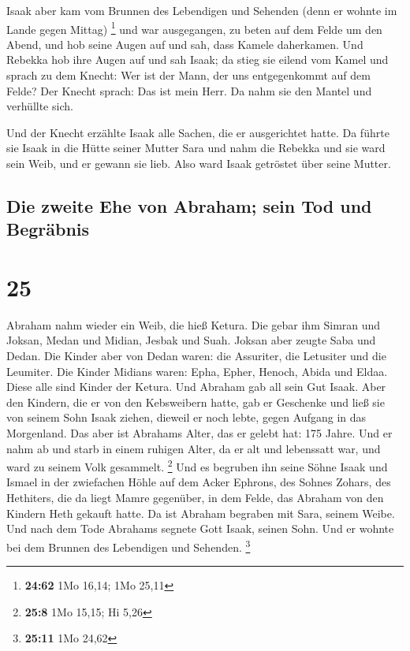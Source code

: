  Isaak aber kam vom Brunnen des Lebendigen und Sehenden
(denn er wohnte im Lande gegen Mittag) \footnote{\textbf{24:62} 1Mo
  16,14; 1Mo 25,11}  und war ausgegangen, zu beten auf
dem Felde um den Abend, und hob seine Augen auf und sah, dass Kamele
daherkamen.  Und Rebekka hob ihre Augen auf und sah
Isaak; da stieg sie eilend vom Kamel  und sprach zu dem
Knecht: Wer ist der Mann, der uns entgegenkommt auf dem Felde? Der
Knecht sprach: Das ist mein Herr. Da nahm sie den Mantel und verhüllte
sich.

 Und der Knecht erzählte Isaak alle Sachen, die er
ausgerichtet hatte.  Da führte sie Isaak in die Hütte
seiner Mutter Sara und nahm die Rebekka und sie ward sein Weib, und er
gewann sie lieb. Also ward Isaak getröstet über seine Mutter.

\hypertarget{die-zweite-ehe-von-abraham-sein-tod-und-begruxe4bnis}{%
\subsection{Die zweite Ehe von Abraham; sein Tod und
Begräbnis}\label{die-zweite-ehe-von-abraham-sein-tod-und-begruxe4bnis}}

\hypertarget{section-24}{%
\section{25}\label{section-24}}

 Abraham nahm wieder ein Weib, die hieß Ketura.
 Die gebar ihm Simran und Joksan, Medan und Midian, Jesbak
und Suah.  Joksan aber zeugte Saba und Dedan. Die Kinder
aber von Dedan waren: die Assuriter, die Letusiter und die Leumiter.
 Die Kinder Midians waren: Epha, Epher, Henoch, Abida und
Eldaa. Diese alle sind Kinder der Ketura.  Und Abraham gab
all sein Gut Isaak.  Aber den Kindern, die er von den
Kebsweibern hatte, gab er Geschenke und ließ sie von seinem Sohn Isaak
ziehen, dieweil er noch lebte, gegen Aufgang in das Morgenland.
 Das aber ist Abrahams Alter, das er gelebt hat: 175
Jahre.  Und er nahm ab und starb in einem ruhigen Alter,
da er alt und lebenssatt war, und ward zu seinem Volk gesammelt.
\footnote{\textbf{25:8} 1Mo 15,15; Hi 5,26}  Und es
begruben ihn seine Söhne Isaak und Ismael in der zwiefachen Höhle auf
dem Acker Ephrons, des Sohnes Zohars, des Hethiters, die da liegt Mamre
gegenüber,  in dem Felde, das Abraham von den Kindern
Heth gekauft hatte. Da ist Abraham begraben mit Sara, seinem Weibe.
 Und nach dem Tode Abrahams segnete Gott Isaak, seinen
Sohn. Und er wohnte bei dem Brunnen des Lebendigen und Sehenden.
\footnote{\textbf{25:11} 1Mo 24,62}

